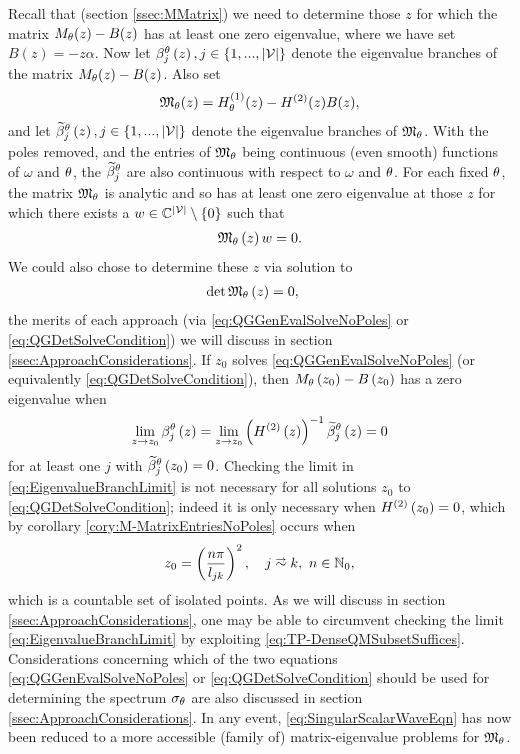 Recall that (section \ref{ssec:MMatrix}) we need to determine those $z$ for which the matrix $M_\theta(z)-B(z)$ has at least one zero eigenvalue, where we have set $B(z) = -z\alpha$.
Now let $\beta_j^{\theta}\left( z \right), j\in\left\{ 1,...,\left\lvert \mathcal{V} \right\rvert \right\}$ denote the eigenvalue branches of the matrix $M_\theta(z)-B(z)$.
Also set 
\begin{align*}
	\mathfrak{M}_\theta(z) = H^{(1)}_\theta(z) - H^{(2)}(z)B(z),
\end{align*}
and let $\widetilde{\beta}_j^{\theta}\left( z \right), j\in\left\{ 1,...,\left\lvert \mathcal{V} \right\rvert \right\}$ denote the eigenvalue branches of $\mathfrak{M}_\theta$.
With the poles removed, and the entries of $\mathfrak{M}_\theta$ being continuous (even smooth) functions of $\omega$ and $\theta$, the $\widetilde{\beta}_j^{\theta}$ are also continuous with respect to $\omega$ and $\theta$.
For each fixed $\theta$, the matrix $\mathfrak{M}_\theta$ is analytic and so has at least one zero eigenvalue at those $z$ for which there exists a $w\in\mathbb{C}^{\left\lvert \mathcal{V} \right\rvert}\setminus\left\{ 0 \right\}$ such that
\begin{align} \label{eq:QGGenEvalSolveNoPoles}
	\mathfrak{M}_\theta\left( z \right)w = 0.
\end{align}
We could also chose to determine these $z$ via solution to 
\begin{align} \label{eq:QGDetSolveCondition}
	\det\mathfrak{M}_\theta\left( z \right) &= 0,
\end{align}
the merits of each approach (via \eqref{eq:QGGenEvalSolveNoPoles} or \eqref{eq:QGDetSolveCondition}) we will discuss in section \ref{ssec:ApproachConsiderations}.
If $z_0$ solves \eqref{eq:QGGenEvalSolveNoPoles} (or equivalently \eqref{eq:QGDetSolveCondition}), then $M_{\theta}\left( z_0 \right)-B\left( z_0 \right)$ has a zero eigenvalue when
\begin{align} \label{eq:EigenvalueBranchLimit}
	\lim_{z\rightarrow z_0} \beta_j^{\theta}\left( z \right) = \lim_{z\rightarrow z_0} \left(  H^{(2)}\left( z \right)  \right)^{-1} \widetilde{\beta}_j^{\theta}\left( z \right) = 0
\end{align}
for at least one $j$ with $\widetilde{\beta}_j^{\theta}\left( z_0 \right)=0$.
Checking the limit in \eqref{eq:EigenvalueBranchLimit} is not necessary for all solutions $z_0$ to \eqref{eq:QGDetSolveCondition}; indeed it is only necessary when $H^{(2)}\left( z_0 \right) = 0$, which by corollary \ref{cory:M-MatrixEntriesNoPoles} occurs when
\begin{align} \label{eq:H2ZerosEqn}
	z_0 = \bracs{ \frac{n\pi}{l_{jk}} }^2, \quad j\conLeft k, \ n\in\naturals_{0},
\end{align}
which is a countable set of isolated points.
As we will discuss in section \ref{ssec:ApproachConsiderations}, one may be able to circumvent checking the limit \eqref{eq:EigenvalueBranchLimit} by exploiting \eqref{eq:TP-DenseQMSubsetSuffices}.
Considerations concerning which of the two equations \eqref{eq:QGGenEvalSolveNoPoles} or \eqref{eq:QGDetSolveCondition} should be used for determining the spectrum $\sigma_\theta$ are also discussed in section \ref{ssec:ApproachConsiderations}.
In any event, \eqref{eq:SingularScalarWaveEqn} has now been reduced to a more accessible (family of) matrix-eigenvalue problems for $\mathfrak{M}_\theta$.

